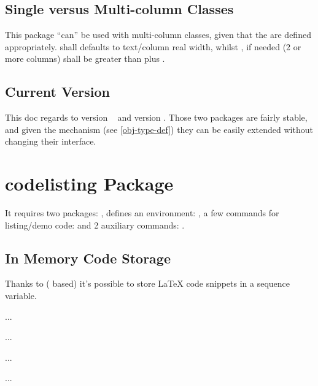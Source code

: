 \documentclass{article}
\begin{document}
\subsection{Single versus Multi-column Classes}
This package ``can'' be used with multi-column classes, given that the \tsobj[code]{\linewidth,\columnsep} are defined appropriately. \tsobj{\linewidth} shall defaults to text/column real width, whilst \tsobj{\columnsep}, if needed (2 or more columns) shall be greater than \tsobj{\marginparwidth} plus \tsobj{\marginparsep}.

\subsection{Current Version}
This doc regards to  version ~ and  version . Those two packages are fairly stable, and given the  mechanism (see \ref{obj-type-def}) they can be easily extended without changing their interface.

\section{codelisting Package}

It requires two packages: ,  defines an environment: , a few commands for listing/demo code: \tsobj[code]{\tscode,\tsmergedcode,\tsdemo,\tsresult,\tsexec} and 2 auxiliary commands: \tsobj{\setcodekeys,\setnewcodekey}.

\subsection{In Memory Code Storage}
Thanks to  ( based) it's possible to store \LaTeX{} code snippets in a  sequence variable.


\begin{codestore}
  \begin{codestore}[store-env = store:A]
  ...
  \end{codestore}
  
  \begin{codestore}[st = store:A]
  ...
  \end{codestore}

  \begin{codestore}[storeA]
  ...
  \end{codestore}
  
  \begin{codestore}[store:A]
  ...  
  \end{codestore}
\end{codestore}
\end{document}
